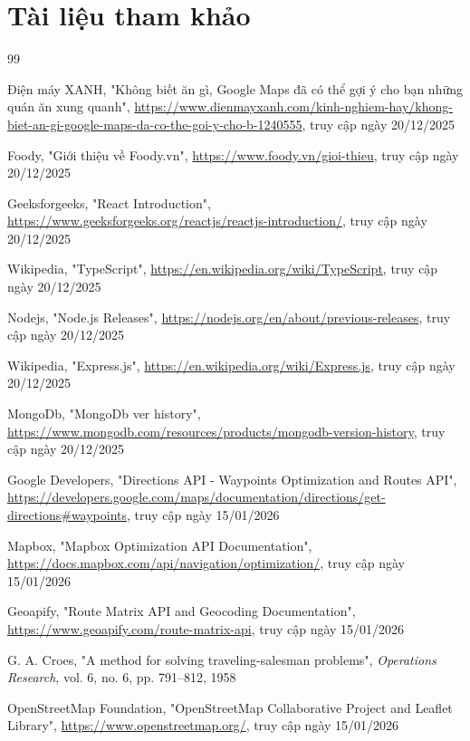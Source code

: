 \section*{Tài liệu tham khảo}

\renewcommand{\refname}{}
\vspace{-1.5em}
\begin{thebibliography}{99}

Điện máy XANH, "Không biết ăn gì, Google Maps đã có thể gợi ý cho bạn những quán ăn xung quanh", \url{https://www.dienmayxanh.com/kinh-nghiem-hay/khong-biet-an-gi-google-maps-da-co-the-goi-y-cho-b-1240555}, truy cập ngày 20/12/2025

Foody, "Giới thiệu về Foody.vn", \url{https://www.foody.vn/gioi-thieu}, truy cập ngày 20/12/2025


Geeksforgeeks, "React Introduction", \url{https://www.geeksforgeeks.org/reactjs/reactjs-introduction/}, truy cập ngày 20/12/2025

Wikipedia, "TypeScript", \url{https://en.wikipedia.org/wiki/TypeScript}, truy cập ngày 20/12/2025

Nodejs, "Node.js Releases", \url{https://nodejs.org/en/about/previous-releases}, truy cập ngày 20/12/2025

Wikipedia, "Express.js", \url{https://en.wikipedia.org/wiki/Express.js}, truy cập ngày 20/12/2025

 MongoDb, "MongoDb ver history", \url{https://www.mongodb.com/resources/products/mongodb-version-history}, truy cập ngày 20/12/2025

Google Developers, "Directions API - Waypoints Optimization and Routes API", \url{https://developers.google.com/maps/documentation/directions/get-directions#waypoints}, truy cập ngày 15/01/2026

Mapbox, "Mapbox Optimization API Documentation", \url{https://docs.mapbox.com/api/navigation/optimization/}, truy cập ngày 15/01/2026

Geoapify, "Route Matrix API and Geocoding Documentation", \url{https://www.geoapify.com/route-matrix-api}, truy cập ngày 15/01/2026

G. A. Croes, "A method for solving traveling-salesman problems", \textit{Operations Research}, vol. 6, no. 6, pp. 791--812, 1958

OpenStreetMap Foundation, "OpenStreetMap Collaborative Project and Leaflet Library", \url{https://www.openstreetmap.org/}, truy cập ngày 15/01/2026

\end{thebibliography}

